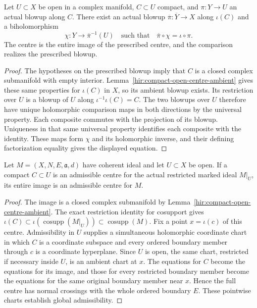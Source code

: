 \begin{theorem}
\label{hir:compact-open-blowup-extension}
\leanok
Let $U\subset X$ be open in a complex manifold, $C\subset U$ compact, and $\pi:Y\to U$ an actual blowup along $C$. There exist an actual blowup $\overline\pi:\overline Y\to X$ along $\iota(C)$ and a biholomorphism
\[
 \chi:Y\longrightarrow\overline\pi^{-1}(U)
 \quad\text{such that}\quad
 \overline\pi\circ\chi=\iota\circ\pi.
\]
The centre is the entire image of the prescribed centre, and the comparison realizes the prescribed blowup.
\end{theorem}
\begin{proof}
The hypotheses on the prescribed blowup imply that $C$ is a closed complex submanifold with empty interior. Lemma~\ref{hir:compact-open-centre-ambient} gives these same properties for $\iota(C)$ in $X$, so its ambient blowup exists. Its restriction over $U$ is a blowup of $U$ along $\iota^{-1}\iota(C)=C$. The two blowups over $U$ therefore have unique holomorphic comparison maps in both directions by the universal property. Each composite commutes with the projection of its blowup. Uniqueness in that same universal property identifies each composite with the identity. These maps form $\chi$ and its holomorphic inverse, and their defining factorization equality gives the displayed equation.
\end{proof}

\begin{lemma}
\label{hir:compact-open-centre-admissible}
\leanok
Let $M=(X,N,E,\mathfrak a,d)$ have coherent ideal and let $U\subset X$ be open. If a compact $C\subset U$ is an admissible centre for the actual restricted marked ideal $M|_U$, its entire image is an admissible centre for $M$.
\end{lemma}
\begin{proof}
The image is a closed complex submanifold by Lemma~\ref{hir:compact-open-centre-ambient}. The exact restriction identity for cosupport gives
$\iota(C)\subset\iota(\operatorname{cosupp}(M|_U))\subset\operatorname{cosupp}(M)$.
Fix a point $x=\iota(c)$ of this centre. Admissibility in $U$ supplies a simultaneous holomorphic coordinate chart in which $C$ is a coordinate subspace and every ordered boundary member through $c$ is a coordinate hyperplane. Since $U$ is open, the same chart, restricted if necessary inside $U$, is an ambient chart at $x$. The equations for $C$ become the equations for its image, and those for every restricted boundary member become the equations for the same original boundary member near $x$. Hence the full centre has normal crossings with the whole ordered boundary $E$. These pointwise charts establish global admissibility.
\end{proof}
